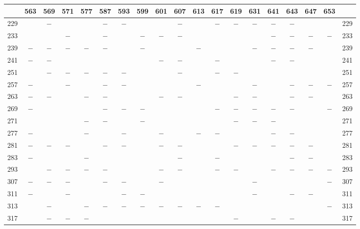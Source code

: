 \clearpage
{}%
\begin{center}\begingroup\fontsize{8}{10.5}\selectfont\setlength{\tabcolsep}{2pt}
\begin{tabular}{r|c|c|c|c|c|c|c|c|c|c|c|c|c|c|c|c|c|r}
\hline
 & 563 & 569 & 571 & 577 & 587 & 593 & 599 & 601 & 607 & 613 & 617 & 619 & 631 & 641 & 643 & 647 & 653 & \\
\hline
229 &  & $-$ &  &  & $-$ & $-$ &  &  & $-$ &  & $-$ & $-$ & $-$ & $-$ & $-$ &  &  & 229\\
233 &  &  & $-$ &  & $-$ &  & $-$ & $-$ & $-$ &  &  &  &  & $-$ & $-$ & $-$ & $-$ & 233\\
239 & $-$ & $-$ & $-$ & $-$ & $-$ &  & $-$ &  &  & $-$ &  &  & $-$ & $-$ & $-$ & $-$ &  & 239\\
241 & $-$ & $-$ &  &  &  &  &  & $-$ & $-$ &  & $-$ &  &  & $-$ & $-$ &  &  & 241\\
251 &  & $-$ & $-$ & $-$ & $-$ & $-$ &  &  & $-$ &  & $-$ & $-$ &  &  &  &  &  & 251\\
257 & $-$ &  & $-$ &  & $-$ & $-$ &  &  &  & $-$ &  &  & $-$ &  & $-$ & $-$ & $-$ & 257\\
263 & $-$ & $-$ &  & $-$ & $-$ &  &  & $-$ & $-$ &  &  & $-$ & $-$ &  & $-$ & $-$ &  & 263\\
269 & $-$ &  &  &  & $-$ & $-$ & $-$ &  &  &  & $-$ & $-$ & $-$ & $-$ & $-$ &  & $-$ & 269\\
271 &  &  &  & $-$ & $-$ &  & $-$ &  &  &  &  & $-$ & $-$ & $-$ &  &  &  & 271\\
277 & $-$ &  &  & $-$ &  & $-$ &  & $-$ &  & $-$ & $-$ &  &  & $-$ & $-$ &  &  & 277\\
281 & $-$ & $-$ & $-$ &  & $-$ & $-$ &  & $-$ & $-$ &  &  & $-$ & $-$ & $-$ & $-$ & $-$ &  & 281\\
283 & $-$ &  &  & $-$ &  &  &  &  & $-$ &  & $-$ &  &  &  & $-$ & $-$ &  & 283\\
293 &  & $-$ & $-$ & $-$ & $-$ &  &  & $-$ & $-$ &  & $-$ & $-$ &  & $-$ & $-$ & $-$ & $-$ & 293\\
307 & $-$ & $-$ & $-$ &  & $-$ & $-$ &  & $-$ &  &  &  &  & $-$ &  &  &  & $-$ & 307\\
311 & $-$ &  & $-$ &  &  & $-$ & $-$ &  &  &  &  &  & $-$ &  & $-$ & $-$ &  & 311\\
313 &  & $-$ &  & $-$ & $-$ & $-$ & $-$ & $-$ & $-$ & $-$ & $-$ &  &  &  &  &  & $-$ & 313\\
317 &  & $-$ & $-$ & $-$ &  &  &  &  &  &  &  & $-$ &  & $-$ & $-$ &  &  & 317\\

\end{tabular}
\end{center}
